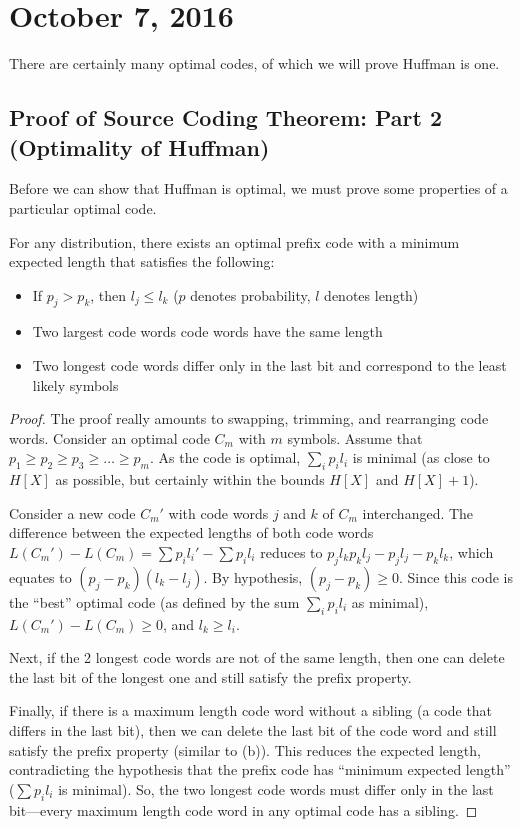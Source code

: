 \documentclass[11pt]{article}
\theoremstyle{definition}
\begin{document}
\section{October 7, 2016}

There are certainly many optimal codes, of which we will prove Huffman is one. 

\subsection{Proof of Source Coding Theorem: Part 2 (Optimality of Huffman)}

Before we can show that Huffman is optimal, we must prove some properties of a particular optimal code. 

\lemma For any distribution, there exists an optimal prefix code with a minimum expected length that satisfies the following:
\begin{itemize}
\item If $p_j > p_k$, then $l_j \leq l_k$ ($p$ denotes probability, $l$ denotes length)
\item Two largest code words code words have the same length
\item Two longest code words differ only in the last bit and correspond to the least likely symbols
\end{itemize} 

\begin{proof}
The proof really amounts to swapping, trimming, and rearranging code words. Consider an optimal code $C_m$ with $m$ symbols. Assume that $p_1 \geq p_2 \geq p_3 \geq \dots \geq p_m$. As the code is optimal, $\sum_i p_i l_i$ is minimal (as close to $H[X]$ as possible, but certainly within the bounds $H[X]$ and $H[X] + 1$).

Consider a new code $C_m'$ with code words $j$ and $k$ of $C_m$ interchanged. The difference between the expected lengths of both code words $L(C_m') - L(C_m) = \sum p_i l_i' - \sum p_i l_i$ reduces to  $p_jl_k p_kl_j - p_jl_j - p_k l_k$, which equates to $(p_j - p_k)(l_k - l_j)$. By hypothesis, $(p_j - p_k) \geq 0$. Since this code is the ``best'' optimal code (as defined by the sum $\sum_i p_i l_i$ as minimal),  $L(C_m') - L(C_m) \geq 0$, and $l_k \geq l_i$. 

Next, if the 2 longest code words are not of the same length, then one can delete the last bit of the longest one and still satisfy the prefix property. 

Finally, if there is a maximum length code word without a sibling (a code that differs in the last bit), then we can delete the last bit of the code word and still satisfy the prefix property (similar to (b)). This reduces the expected length, contradicting the hypothesis that the prefix code has ``minimum expected length'' ($\sum p_i l_i$ is minimal). So, the two longest code words must differ only in the last bit---every maximum length code word in any optimal code has a sibling. 
\end{proof}
\end{document}
